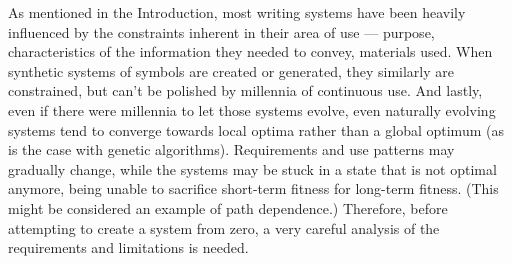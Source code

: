 \documentclass{vgtc}                          %
\begin{document}
As mentioned in the Introduction, most writing systems have been heavily influenced by the constraints inherent in their area of use --- purpose, characteristics of the information they needed to convey, materials used. When synthetic systems of symbols are created or generated, they similarly are constrained, but can't be polished by millennia of continuous use. And lastly, even if there were millennia to let those systems evolve, even naturally evolving systems tend to converge towards local optima rather than a global optimum (as is the case with genetic algorithms). Requirements and use patterns may gradually change, while the systems may be stuck in a state that is not optimal anymore, being unable to sacrifice short-term fitness for long-term fitness. (This might be considered an example of path dependence.) Therefore, before attempting to create a system from zero, a very careful analysis of the requirements and limitations is needed.
\end{document}
